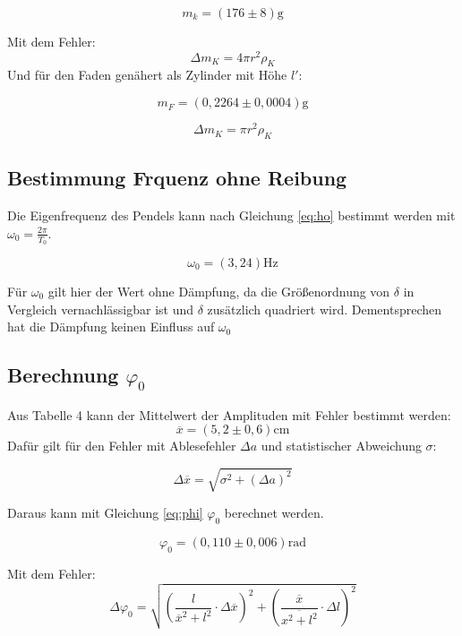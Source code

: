 \[m_k = (176 \pm 8) \si{\gram}\]

Mit dem Fehler:
\begin{equation}
    \Delta m_K = 4\pi r^2 \rho_K
\end{equation}
Und für den Faden genähert als Zylinder mit Höhe $l'$:

\[m_F = (0,2264 \pm 0,0004) \si{\gram}\]

\begin{equation}
    \Delta m_K = \pi r^2 \rho_K
\end{equation}

\subsection{Bestimmung Frquenz ohne Reibung}
Die Eigenfrequenz des Pendels kann nach Gleichung \ref{eq:ho} bestimmt werden mit $\omega_0 = \tfrac{2\pi}{T_0}$. 

\[ \omega_0 = (3,24 ) \si{\Hz} \]

Für $\omega_0$ gilt hier der Wert ohne Dämpfung, da die Größenordnung von $\delta$ in Vergleich vernachlässigbar ist und $\delta$ zusätzlich quadriert wird.
Dementsprechen hat die Dämpfung keinen Einfluss auf $\omega_0$

\subsection{Berechnung $\varphi_0$}
Aus Tabelle 4 kann der Mittelwert der Amplituden mit Fehler bestimmt werden:
\[ \overline{x} = (5,2 \pm 0,6) \si{\cm}\]
Dafür gilt für den Fehler mit Ablesefehler $\Delta a$ und statistischer Abweichung $\sigma$:

\begin{equation}
    \Delta \overline{x} = \sqrt{\sigma^2 + (\Delta a)^2}
\end{equation}

Daraus kann mit Gleichung \ref{eq:phi} $\varphi_0$ berechnet werden.

\[\varphi_0 =( 0,110 \pm 0,006 )\si{\text{rad}}\]

Mit dem Fehler:
\begin{equation}
\Delta \varphi_{0} = 
\sqrt{ \left( \frac{l}{\overline{x}^{2} + l^{2}} \cdot \Delta \overline{x} \right)^{2} 
    + \left( \frac{\overline{x}}{\overline{x^{2} + l^{2}}} \cdot \Delta l \right)^{2} }
\end{equation}

